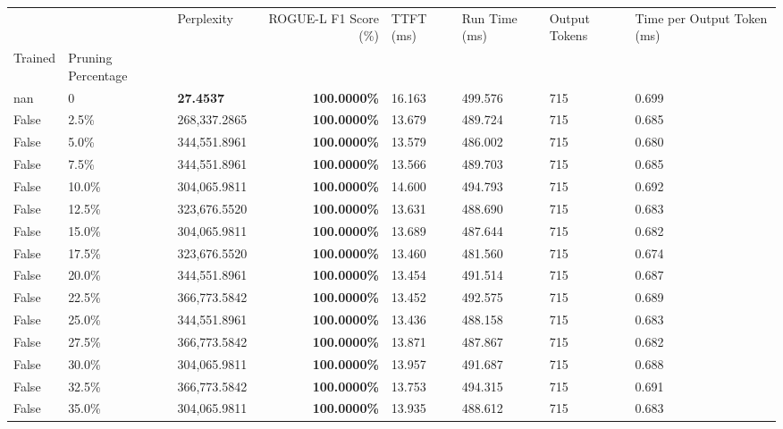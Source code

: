 \begin{table}[H]
\label{tab:evaluation-pipeline-2-untrained}
\begin{tabular}{lllrllll}
\toprule
 &  & Perplexity & ROGUE-L F1 Score (\%) & TTFT (ms) & Run Time (ms) & Output Tokens & Time per Output Token (ms) \\
Trained & Pruning Percentage &  &  &  &  &  &  \\
\midrule
nan & 0 & \bfseries 27.4537 & \bfseries 100.0000\% & 16.163 & 499.576 & 715 & 0.699 \\
\cline{1-8}
False & 2.5\% & \color{red} 268,337.2865 & \bfseries \color{red} 100.0000\% & 13.679 & 489.724 & 715 & 0.685 \\
\cline{1-8}
False & 5.0\% & 344,551.8961 & \bfseries \color{red} 100.0000\% & 13.579 & 486.002 & 715 & 0.680 \\
\cline{1-8}
False & 7.5\% & 344,551.8961 & \bfseries \color{red} 100.0000\% & 13.566 & 489.703 & 715 & 0.685 \\
\cline{1-8}
False & 10.0\% & 304,065.9811 & \bfseries \color{red} 100.0000\% & 14.600 & 494.793 & 715 & 0.692 \\
\cline{1-8}
False & 12.5\% & 323,676.5520 & \bfseries \color{red} 100.0000\% & 13.631 & 488.690 & 715 & 0.683 \\
\cline{1-8}
False & 15.0\% & 304,065.9811 & \bfseries \color{red} 100.0000\% & 13.689 & 487.644 & 715 & 0.682 \\
\cline{1-8}
False & 17.5\% & 323,676.5520 & \bfseries \color{red} 100.0000\% & 13.460 & 481.560 & 715 & 0.674 \\
\cline{1-8}
False & 20.0\% & 344,551.8961 & \bfseries \color{red} 100.0000\% & 13.454 & 491.514 & 715 & 0.687 \\
\cline{1-8}
False & 22.5\% & 366,773.5842 & \bfseries \color{red} 100.0000\% & 13.452 & 492.575 & 715 & 0.689 \\
\cline{1-8}
False & 25.0\% & 344,551.8961 & \bfseries \color{red} 100.0000\% & 13.436 & 488.158 & 715 & 0.683 \\
\cline{1-8}
False & 27.5\% & 366,773.5842 & \bfseries \color{red} 100.0000\% & 13.871 & 487.867 & 715 & 0.682 \\
\cline{1-8}
False & 30.0\% & 304,065.9811 & \bfseries \color{red} 100.0000\% & 13.957 & 491.687 & 715 & 0.688 \\
\cline{1-8}
False & 32.5\% & 366,773.5842 & \bfseries \color{red} 100.0000\% & 13.753 & 494.315 & 715 & 0.691 \\
\cline{1-8}
False & 35.0\% & 304,065.9811 & \bfseries \color{red} 100.0000\% & 13.935 & 488.612 & 715 & 0.683 \\

\end{tabular}
\end{table}
